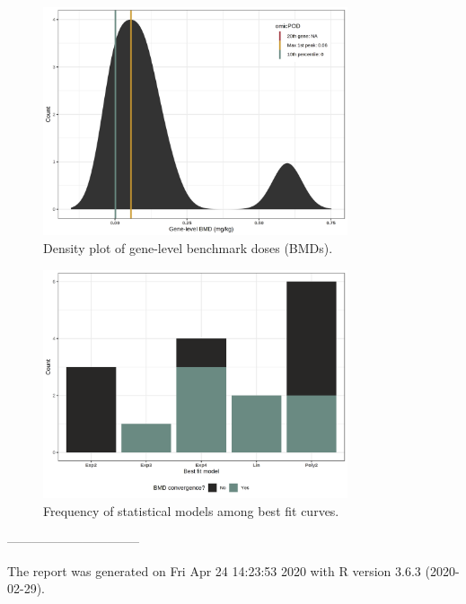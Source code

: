 \documentclass[a4paper]{article}
\begin{document}
\begin{figure}[htp]
\begin{center}
\includegraphics[width=0.8\textwidth]{dr_histogram_0dpi72.png}
\caption{
Density plot of gene-level benchmark doses (BMDs).
}
\end{center}
\label{dr_histogram_0dpi72.png}
\end{figure}
\begin{figure}[htp]
\begin{center}
\includegraphics[width=0.8\textwidth]{dr_barplot_0dpi72.png}
\caption{
Frequency of statistical models among best fit curves.
}
\end{center}
\label{dr_barplot_0dpi72.png}
\end{figure}
\vspace{5 mm}
--------------------------------

 The report was generated on Fri Apr 24 14:23:53 2020 with R version 3.6.3 (2020-02-29).
 
\end{document}
